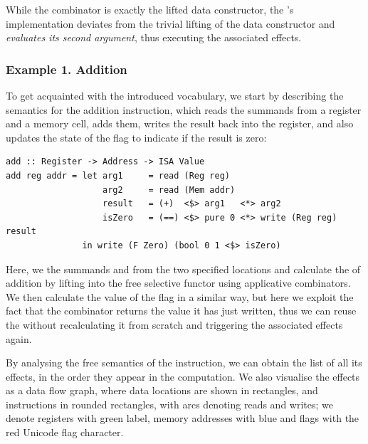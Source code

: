 \noindent
While the  combinator is exactly the lifted  data
constructor, the 's implementation deviates from the trivial lifting
of the  data constructor and \emph{evaluates its second argument},
thus executing the associated effects.

\subsubsection{Example 1. Addition}

To get acquainted with the introduced vocabulary, we start by describing the
semantics for the addition instruction, which reads the summands from a
register and a memory cell, adds them, writes the result back into the register,
and also updates the state of the  flag to indicate if the result is
zero:

\vspace{1mm}
\begin{verbatim}
add :: Register -> Address -> ISA Value
add reg addr = let arg1     = read (Reg reg)
                   arg2     = read (Mem addr)
                   result   = (+)  <$> arg1   <*> arg2
                   isZero   = (==) <$> pure 0 <*> write (Reg reg) result
               in write (F Zero) (bool 0 1 <$> isZero)
\end{verbatim}
\vspace{1mm}

\noindent
Here, we  the summands  and  from the two specified
locations and calculate the  of addition by lifting \hs{(+)} into the
free selective functor using applicative combinators. We then calculate the
value of the  flag in a similar way, but here we exploit the fact that
the  combinator returns the value it has just written, thus we can
reuse the  without recalculating it from scratch and triggering the
associated effects again.


By analysing the free semantics of the  instruction, we can obtain the
list of all its effects, in the order they appear in the computation. We also
visualise the effects as a data flow graph, where data locations are shown in
rectangles, and instructions in rounded rectangles, with arcs denoting reads
and writes; we denote registers with green  label, memory addresses
with blue  and flags with the red Unicode flag character.

